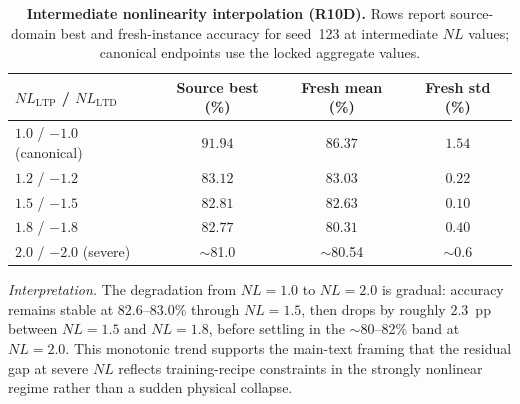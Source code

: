\begin{table}[ht]
    \centering
    \caption{\textbf{Intermediate nonlinearity interpolation (R10D).} Rows report source-domain best and fresh-instance accuracy for seed~123 at intermediate $NL$ values; canonical endpoints use the locked aggregate values.}
    \label{tab:r10d-nl-interpolation}
    \small
    \begin{tabular}{@{}lccc@{}}
        \toprule
        $NL_{\text{LTP}}$ / $NL_{\text{LTD}}$ & Source best (\%) & Fresh mean (\%) & Fresh std (\%) \\
        \midrule
        $1.0$ / $-1.0$ (canonical) & $91.94$ & $86.37$ & $1.54$ \\
        $1.2$ / $-1.2$ & $83.12$ & $83.03$ & $0.22$ \\
        $1.5$ / $-1.5$ & $82.81$ & $82.63$ & $0.10$ \\
        $1.8$ / $-1.8$ & $82.77$ & $80.31$ & $0.40$ \\
        $2.0$ / $-2.0$ (severe) & $\sim$81.0 & $\sim$80.54 & $\sim$0.6 \\
        \bottomrule
    \end{tabular}
\end{table}

\textit{Interpretation.} The degradation from $NL=1.0$ to $NL=2.0$ is gradual: accuracy remains stable at $82.6$--$83.0$\% through $NL=1.5$, then drops by roughly $2.3$~pp between $NL=1.5$ and $NL=1.8$, before settling in the $\sim$80--82\% band at $NL=2.0$. This monotonic trend supports the main-text framing that the residual gap at severe $NL$ reflects training-recipe constraints in the strongly nonlinear regime rather than a sudden physical collapse.

